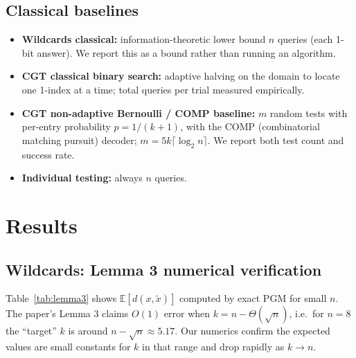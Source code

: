 \documentclass[11pt]{article}
\begin{document}
\subsection{Classical baselines}
\begin{itemize}
  \item \textbf{Wildcards classical:} information-theoretic lower bound
  $n$ queries (each 1-bit answer). We report this as a bound rather than
  running an algorithm.
  \item \textbf{CGT classical binary search:} adaptive halving on the
  domain to locate one 1-index at a time; total queries per trial
  measured empirically.
  \item \textbf{CGT non-adaptive Bernoulli / COMP baseline:} $m$ random
  tests with per-entry probability $p=1/(k+1)$, with the COMP
  (combinatorial matching pursuit) decoder; $m=5k\lceil\log_2 n\rceil$.
  We report both test count and success rate.
  \item \textbf{Individual testing:} always $n$ queries.
\end{itemize}

\section{Results}

\subsection{Wildcards: Lemma 3 numerical verification}

Table~\ref{tab:lemma3} shows $\mathbb{E}[d(x,\tilde x)]$ computed by exact
PGM for small $n$. The paper's Lemma 3 claims $O(1)$ error when
$k = n-\Theta(\sqrt n)$, i.e.~for $n=8$ the ``target'' $k$ is around
$n-\sqrt n \approx 5.17$. Our numerics confirm the expected values are
small constants for $k$ in that range and drop rapidly as $k\to n$.
\end{document}
